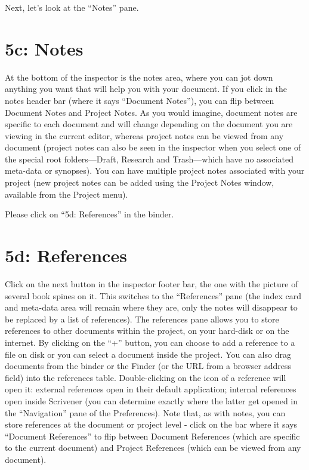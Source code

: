 \documentclass[10pt,oneside]{memoir}
\begin{document}
Next, let's look at the ``Notes'' pane.


\pagebreak \section{5c: Notes}
\label{c:notes}

At the bottom of the inspector is the notes area, where you can jot down anything you want that will help you with your document. If you click in the notes header bar (where it says ``Document Notes''), you can flip between Document Notes and Project Notes. As you would imagine, document notes are specific to each document and will change depending on the document you are viewing in the current editor, whereas project notes can be viewed from any document (project notes can also be seen in the inspector when you select one of the special root folders---Draft, Research and Trash---which have no associated meta-data or synopses). You can have multiple project notes associated with your project (new project notes can be added using the Project Notes window, available from the Project menu).


Please click on ``5d: References'' in the binder.


\pagebreak \section{5d: References}
\label{d:references}

Click on the next button in the inspector footer bar, the one with the picture of several book spines on it. This switches to the ``References'' pane (the index card and meta-data area will remain where they are, only the notes will disappear to be replaced by a list of references). The references pane allows you to store references to other documents within the project, on your hard-disk or on the internet. By clicking on the ``+'' button, you can choose to add a reference to a file on disk or you can select a document inside the project. You can also drag documents from the binder or the Finder (or the URL from a browser address field) into the references table. Double-clicking on the icon of a reference will open it: external references open in their default application; internal references open inside Scrivener (you can determine exactly where the latter get opened in the ``Navigation'' pane of the Preferences). Note that, as with notes, you can store references at the document or project level - click on the bar where it says ``Document References'' to flip between Document References (which are specific to the current document) and Project References (which can be viewed from any document).
\end{document}
